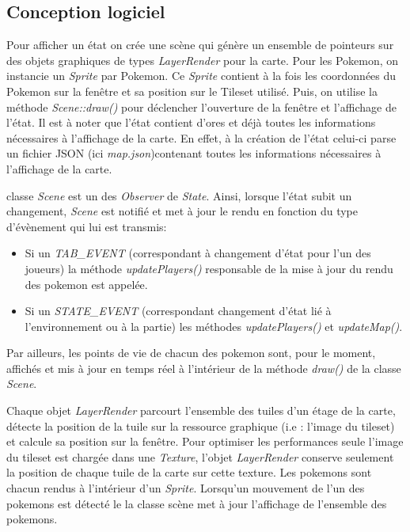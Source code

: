 \documentclass[a4paper,12pt]{article}
\begin{document}
    \subsection{Conception logiciel}
Pour afficher un état on crée une scène qui génère un ensemble de pointeurs sur des objets graphiques de types \emph{LayerRender} pour la carte.
Pour les Pokemon, on instancie un \emph{Sprite} par Pokemon. Ce \emph{Sprite} contient à la fois les coordonnées du Pokemon sur la fenêtre et sa position sur le Tileset utilisé. Puis, on utilise la méthode \emph{Scene::draw()} pour déclencher l'ouverture de la fenêtre et l'affichage de l'état.
Il est à noter que l'état contient d'ores et déjà toutes les informations nécessaires à l'affichage de la carte. En effet, à la création de l'état celui-ci parse un fichier JSON (ici \emph{map.json})contenant toutes les informations nécessaires à l'affichage de la carte.

 classe \emph{Scene} est un des \emph{Observer} de \emph{State}. Ainsi, lorsque l'état subit un changement, \emph{Scene} est notifié et met à jour le rendu en fonction du type d'évènement qui lui est transmis:
\begin{itemize}
\item Si un \emph{TAB\_EVENT} (correspondant à changement d'état pour l'un des joueurs) la méthode \emph{updatePlayers()} responsable de la mise à jour du rendu des pokemon est appelée.
\item Si un \emph{STATE\_EVENT} (correspondant changement d'état lié à l'environnement ou à la partie) les méthodes \emph{updatePlayers()} et \emph{updateMap()}.
\end{itemize}
Par ailleurs, les points de vie de chacun des pokemon sont, pour le moment, affichés et mis à jour en temps réel à l'intérieur de la méthode \emph{draw()} de la classe \emph{Scene}.

Chaque objet \emph{LayerRender} parcourt l'ensemble des tuiles d'un étage de la carte, détecte la position de la tuile sur la ressource graphique (i.e : l'image du tileset) et calcule sa position sur la fenêtre. Pour optimiser les performances seule l'image du tileset est chargée dans une \emph{Texture}, l'objet \emph{LayerRender} conserve seulement la position de chaque tuile de la carte sur cette texture.
Les pokemons sont chacun rendus à l'intérieur d'un \emph{Sprite}.
Lorsqu'un mouvement de l'un des pokemons est détecté le la classe scène met à jour l'affichage de l'ensemble des pokemons.
\end{document}
